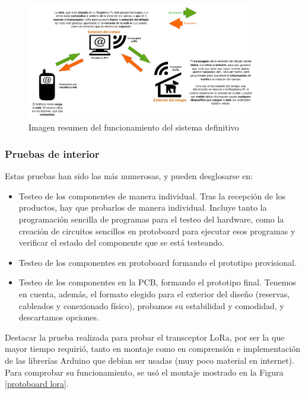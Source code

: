 \documentclass[12pt]{article}
\begin{document}
	\begin{figure}[h!]
		\begin{center}
			\includegraphics[width=0.9\textwidth]{img/conexiones tfg-digrama resumen web.png}
			\caption{Imagen resumen del funcionamiento del sistema definitivo}
			\label{imagen resumen sistema final}
		\end{center}
	\end{figure}

	
	\subsubsection{Pruebas de interior}
	\label{pruebas de interior}
	
	\noindent Estas pruebas han sido las más numerosas, y pueden desglosarse en: 
	
	\begin{itemize}
		\item Testeo de los componentes de manera individual. Tras la recepción de los productos, hay que probarlos de manera individual. Incluye tanto la programación sencilla de programas para el testeo del hardware, como la creación de circuitos sencillos en protoboard para ejecutar esos programas y verificar el estado del componente que se está testeando.
		\item Testeo de los componentes en protoboard formando el prototipo provisional.
		\item Testeo de los componentes en la PCB, formando el prototipo final. Tenemos en cuenta, además, el formato elegido para el exterior del diseño (reservas, cableados y conexionado físico), probamos su estabilidad y comodidad, y descartamos opciones.
	\end{itemize}
	
	\noindent Destacar la prueba realizada para probar el transceptor LoRa, por ser la que mayor tiempo requirió, tanto en montaje como en comprensión e implementación de las librerías Arduino que debían ser usadas (muy poco material en internet). Para comprobar su funcionamiento, se usó el montaje mostrado en la Figura \ref{protoboard lora}. \\
	
\end{document}
